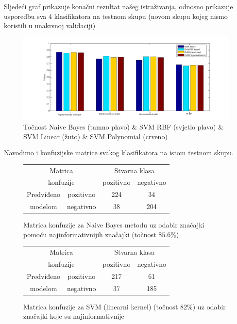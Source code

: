 \documentclass[conference]{IEEEtran}
\begin{document}
Sljedeći graf prikazuje konačni rezultat našeg istraživanja, odnosno prikazuje
usporedbu sva 4 klasifikatora na testnom skupu (novom skupu kojeg nismo
koristili u unakrsnoj validaciji)

\begin{figure}[H]
\begin{minipage}{0.5\textwidth}
\centering
\includegraphics[width=\textwidth]{images/SVM_tocnost.png}
\caption{Točnost Naive Bayes (tamno plavo) \& SVM RBF (svjetlo plavo) \& SVM Linear (žuto) \& SVM Polynomial (crveno)}
\end{minipage}
\end{figure}

Navodimo i konfuzijske matrice svakog klasifikatora na istom testnom skupu.

\begin{figure}[H]
\begin{minipage}{0.5\textwidth}
\centering
\begin{tabular}{|c|c|c|c|}
  \hline
  \multicolumn{2}{|c|}{Matrica}  & \multicolumn{2}{|c|}{Stvarna klasa} \\ 
  \cline{3-4}
  \multicolumn{2}{|c|}{konfuzije} & pozitivno & negativno \\ 
  \hline
  Predviđeno & pozitivno & 224 & 34 \\
  \cline{2-4}
  modelom & negativno & 38 & 204 \\
  \hline
\end{tabular}
\caption{Matrica konfuzije za Naive Bayes metodu uz odabir značajki pomoću najinformativnijih značajki (točnost $85.6\%$)}
\end{minipage}
\end{figure}

\begin{figure}[H]
\begin{minipage}{0.5\textwidth}
\centering
\begin{tabular}{|c|c|c|c|}
  \hline
  \multicolumn{2}{|c|}{Matrica}  & \multicolumn{2}{|c|}{Stvarna klasa} \\ 
  \cline{3-4}
  \multicolumn{2}{|c|}{konfuzije} & pozitivno & negativno \\ 
  \hline
  Predviđeno & pozitivno & 217 & 61 \\
  \cline{2-4}
  modelom & negativno & 37 & 185 \\
  \hline
\end{tabular}
\caption{Matrica konfuzije za SVM (linearni kernel) (točnost $82\%$) uz odabir značajki koje su najinformativnije}
\end{minipage}
\end{figure}
\end{document}
